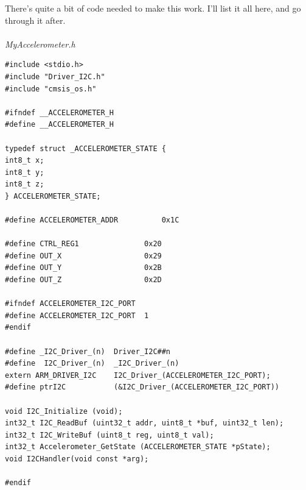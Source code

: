 \documentclass{article}
\begin{document}
There's quite a bit of code needed to make this work. I'll list it all here,
and go through it after.\\
\\
\textit{MyAccelerometer.h}
\begin{lstlisting}
#include <stdio.h>
#include "Driver_I2C.h"
#include "cmsis_os.h"

#ifndef __ACCELEROMETER_H
#define __ACCELEROMETER_H

typedef struct _ACCELEROMETER_STATE {
int8_t x;
int8_t y;
int8_t z;
} ACCELEROMETER_STATE;

#define ACCELEROMETER_ADDR 			0x1C

#define CTRL_REG1             	0x20
#define OUT_X                 	0x29
#define OUT_Y                 	0x2B
#define OUT_Z                 	0x2D

#ifndef ACCELEROMETER_I2C_PORT
#define ACCELEROMETER_I2C_PORT 	1
#endif

#define _I2C_Driver_(n)  Driver_I2C##n
#define  I2C_Driver_(n)  _I2C_Driver_(n)
extern ARM_DRIVER_I2C    I2C_Driver_(ACCELEROMETER_I2C_PORT);
#define ptrI2C           (&I2C_Driver_(ACCELEROMETER_I2C_PORT))

void I2C_Initialize (void);
int32_t I2C_ReadBuf (uint32_t addr, uint8_t *buf, uint32_t len);
int32_t I2C_WriteBuf (uint8_t reg, uint8_t val);
int32_t Accelerometer_GetState (ACCELEROMETER_STATE *pState);
void I2CHandler(void const *arg);

#endif
\end{lstlisting}
\end{document}
